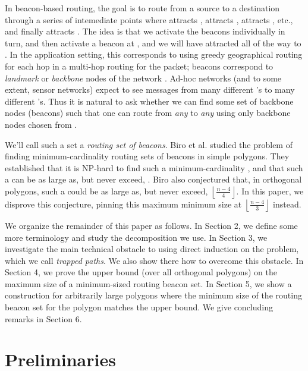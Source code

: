 \documentclass{article}
\newcommand{\floor}[2]{\ensuremath{\left \lfloor {\frac{#1}{#2}} \right
\rfloor}}
\begin{document}
	In beacon-based routing, the goal is to route from a source  to a
	destination  through a series of intemediate points 
	where  attracts ,  attracts ,  attracts , etc., and
	finally  attracts .  The idea is that we activate the beacons 
	 individually in turn, and then activate a beacon at , 
	and we will have attracted  all of the way to .
	In the application setting, this corresponds to using greedy geographical
	routing for each hop in a multi-hop routing for the packet; beacons correspond
	to \emph{landmark} or \emph{backbone} nodes of the network \cite{4215665}.
	Ad-hoc networks (and to some extent, sensor networks) expect to see messages
	from many different 's to many different 's.
	Thus it is natural to ask whether we can find some set  of backbone nodes
	(beacons) such that one can route from \emph{any}  to \emph{any}  using
	only backbone nodes chosen from . 
	
	We'll call such a set  a \emph{routing set of beacons}.
	Biro et al.\cite{BiroGaoIwerks} studied the
	problem of finding minimum-cardinality routing sets of beacons
	in simple polygons.
	They established that it is NP-hard to find such a minimum-cardinality , and
	that such a  can be as large as, but never exceed, .
	Biro also conjectured \cite{biro2013beacon} that, in orthogonal polygons,
	such a  could be as large as, but never exceed, \floor{n-4}{4}.
	In this paper, we disprove this conjecture, pinning this maximum
	minimum size at \floor{n-4}{3} instead.
	

 	We organize the remainder of this paper as follows.
 	In Section 2, we define some more terminology and study the decomposition we use.
 	In Section 3, we investigate
 	    the main technical obstacle to using direct induction on the problem,
 	    which we call \emph{trapped paths}.  We also show there how to overcome
 	    this obstacle.
 	In Section 4, we prove the upper bound (over all orthogonal polygons)
 	    on the maximum size of a minimum-sized routing beacon set.
 	In Section 5, we show a construction for arbitrarily large polygons where the
 	minimum size of the routing beacon set for the polygon matches the upper
 	bound.
 	We give concluding remarks in Section 6.
 	
 	
\section{Preliminaries}		
\end{document}
